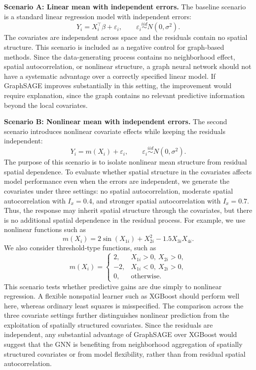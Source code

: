 \documentclass[ASNA, twocolumn]{USG} %
\begin{document}
\noindent \textbf{Scenario A: Linear mean with independent errors.}
The baseline scenario is a standard linear regression model with independent errors:
\[
Y_i = X_i^\top\beta + \varepsilon_i,
\qquad
\varepsilon_i \overset{iid}{\sim} N(0,\sigma^2).
\]
The covariates are independent across space and the residuals contain no spatial structure. This scenario is included as a negative control for graph-based methods. Since the data-generating process contains no neighborhood effect, spatial autocorrelation, or nonlinear structure, a graph neural network should not have a systematic advantage over a correctly specified linear model. If GraphSAGE improves substantially in this setting, the improvement would require explanation, since the graph contains no relevant predictive information beyond the local covariates.

\noindent \textbf{Scenario B: Nonlinear mean with independent errors.}
The second scenario introduces nonlinear covariate effects while keeping the residuals independent:
\[
Y_i = m(X_i) + \varepsilon_i,
\qquad
\varepsilon_i \overset{iid}{\sim} N(0,\sigma^2).
\]
The purpose of this scenario is to isolate nonlinear mean structure from residual spatial dependence. To evaluate whether spatial structure in the covariates affects model performance even when the errors are independent, we generate the covariates under three settings: no spatial autocorrelation, moderate spatial autocorrelation with \(I_x=0.4\), and stronger spatial autocorrelation with \(I_x=0.7\). Thus, the response may inherit spatial structure through the covariates, but there is no additional spatial dependence in the residual process.
For example, we use nonlinear functions such as
\[
m(X_i) =
2\sin(X_{1i}) + X_{2i}^2 - 1.5X_{3i}X_{4i}.
\]
We also consider threshold-type functions, such as
\[
m(X_i)=
\begin{cases}
2, & X_{1i}>0,\ X_{2i}>0,\\
-2, & X_{1i}<0,\ X_{2i}>0,\\
0, & \text{otherwise}.
\end{cases}
\]
This scenario tests whether predictive gains are due simply to nonlinear regression. A flexible nonspatial learner such as XGBoost should perform well here, whereas ordinary least squares is misspecified. The comparison across the three covariate settings further distinguishes nonlinear prediction from the exploitation of spatially structured covariates. Since the residuals are independent, any substantial advantage of GraphSAGE over XGBoost would suggest that the GNN is benefiting from neighborhood aggregation of spatially structured covariates or from model flexibility, rather than from residual spatial autocorrelation. \medskip
\end{document}
